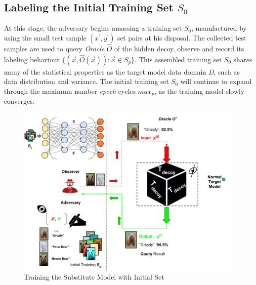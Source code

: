\documentclass[grad,lot,lof,11pt,oneside,onehalfspace]{RUthesis}
\begin{document}
\subsection{Labeling the Initial Training Set \textbf{$S_{0}$}}
At this stage, the adversary begins amassing a training set \textit{$S_{0}$}, manufactured by using the small test sample $(x^{'},y^{'})$ set pairs at his disposal. The collected test samples are used to query \textit{Oracle} \textit{$\hat{O}$} of the hidden decoy, observe and record its labeling behaviour $\{(\vec{x},\hat{O}(\vec{x})):\vec{x}\in S_{p}\}$. This assembled training set \textit{$S_{0}$} shares many of the statistical properties as the target model data domain \textit{D}, such as data distribution and variance. The initial training set \textit{$S_{0}$} will continue to expand through the maximum number \textit{epoch} cycles \textit{$max_{p}$}, as the training model slowly converges.
\begin{figure}[h]
\centering
\includegraphics[width=0.8\linewidth]{"Images/Chapter 4/TrainingSubstitute"}
\caption{Training the Substitute Model with Initial Set}
\label{fig:TrainingSubstitute}
\end{figure}
\end{document}
